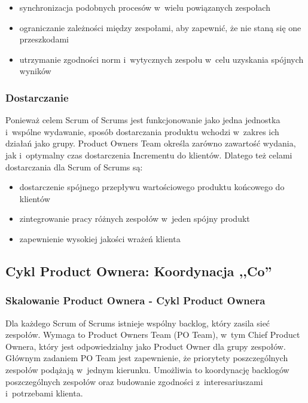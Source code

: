 \documentclass[12pt,a4paper,parskip=full]{scrartcl}
\begin{document}
\begin{itemize}
\itemsep1pt\parskip0pt
\item
  synchronizacja podobnych procesów w~wielu powiązanych zespołach
\item
  ograniczanie zależności między zespołami, aby zapewnić, że nie staną się one przeszkodami
\item
  utrzymanie zgodności norm i~wytycznych zespołu w~celu uzyskania spójnych wyników
\end{itemize}

\subsubsection{Dostarczanie}\label{Delivery}

Ponieważ celem Scrum of Scrums jest funkcjonowanie jako jedna jednostka i~wspólne wydawanie, sposób dostarczania produktu wchodzi w~zakres ich działań jako grupy. Product Owners Team określa zarówno zawartość wydania, jak i~optymalny czas dostarczenia Incrementu do klientów.  Dlatego też celami dostarczania dla Scrum of Scrums są:

\begin{itemize}
\itemsep1pt\parskip0pt
\item
  dostarczenie spójnego przepływu wartościowego produktu końcowego do klientów
\item
  zintegrowanie pracy różnych zespołów w~jeden spójny produkt
\item
  zapewnienie wysokiej jakości wrażeń klienta
\end{itemize}

\subsection{Cykl Product Ownera: Koordynacja ,,Co''}\label{The-product-owner-cycle}

\subsubsection{Skalowanie Product Ownera - Cykl Product Ownera}\label{Scaling-the-product-owner}

Dla każdego Scrum of Scrums istnieje wspólny backlog, który zasila sieć zespołów. Wymaga to Product Owners Team (PO Team), w~tym Chief Product Ownera, który jest odpowiedzialny jako Product Owner dla grupy zespołów. Głównym zadaniem PO Team jest zapewnienie, że priorytety poszczególnych zespołów podążają w~jednym kierunku. Umożliwia to koordynację backlogów poszczególnych zespołów oraz budowanie zgodności z~interesariuszami i~potrzebami klienta.
\end{document}
